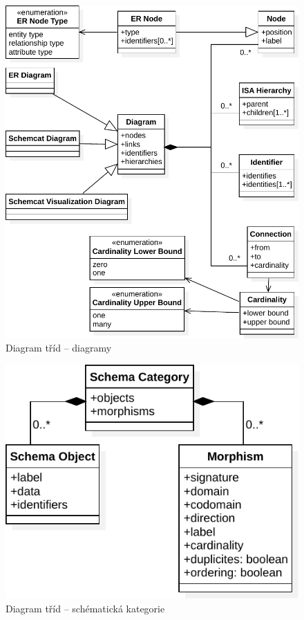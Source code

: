 \begin{figure}[!htb]
  \centering
  \includegraphics[width=\maxwidth{\textwidth}]{../img/diagrams/diagram-model.pdf}
  \caption{Diagram tříd -- diagramy}
\end{figure}
\begin{figure}[!htb]
  \centering
  \includegraphics[width=\maxwidth{\textwidth}]{../img/diagrams/schema-category-model.pdf}
  \caption{Diagram tříd -- schématická kategorie}
\end{figure}

